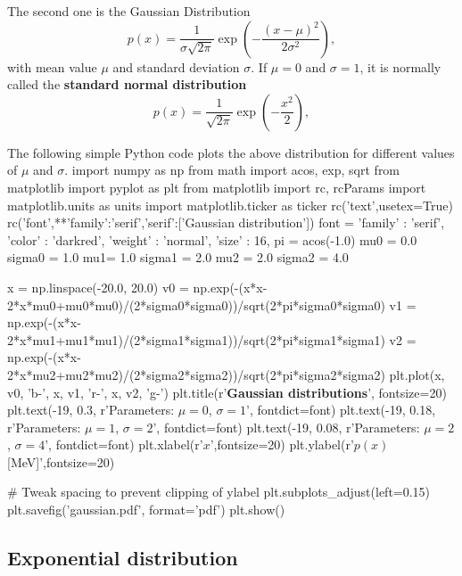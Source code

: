 \documentclass[%
oneside,                 %
final,                   %
10pt]{article}
\newenvironment{block_mdfboxadmon}[1][]{
\begin{block_mdfboxmdframed}[frametitle=#1]
}
{
\end{block_mdfboxmdframed}
}
\begin{document}
\begin{block_mdfboxadmon}[]
The second one is the Gaussian Distribution
\begin{equation*}
p(x) = \frac{1}{\sigma\sqrt{2\pi}} \exp{(-\frac{(x-\mu)^2}{2\sigma^2})},
\end{equation*}
with mean value $\mu$ and standard deviation $\sigma$. If $\mu=0$ and $\sigma=1$, it is normally called the \textbf{standard normal distribution}
\begin{equation*}
p(x) = \frac{1}{\sqrt{2\pi}} \exp{(-\frac{x^2}{2})},
\end{equation*}

The following simple Python code plots the above distribution for different values of $\mu$ and $\sigma$. 
\bpypro
import numpy as np
from math import acos, exp, sqrt
from  matplotlib import pyplot as plt
from matplotlib import rc, rcParams
import matplotlib.units as units
import matplotlib.ticker as ticker
rc('text',usetex=True)
rc('font',**{'family':'serif','serif':['Gaussian distribution']})
font = {'family' : 'serif',
        'color'  : 'darkred',
        'weight' : 'normal',
        'size'   : 16,
        }
pi = acos(-1.0)
mu0 = 0.0
sigma0 = 1.0
mu1= 1.0
sigma1 = 2.0
mu2 = 2.0
sigma2 = 4.0

x = np.linspace(-20.0, 20.0)
v0 = np.exp(-(x*x-2*x*mu0+mu0*mu0)/(2*sigma0*sigma0))/sqrt(2*pi*sigma0*sigma0)
v1 = np.exp(-(x*x-2*x*mu1+mu1*mu1)/(2*sigma1*sigma1))/sqrt(2*pi*sigma1*sigma1)
v2 = np.exp(-(x*x-2*x*mu2+mu2*mu2)/(2*sigma2*sigma2))/sqrt(2*pi*sigma2*sigma2)
plt.plot(x, v0, 'b-', x, v1, 'r-', x, v2, 'g-')
plt.title(r'{\bf Gaussian distributions}', fontsize=20)
plt.text(-19, 0.3, r'Parameters: $\mu = 0$, $\sigma = 1$', fontdict=font)
plt.text(-19, 0.18, r'Parameters: $\mu = 1$, $\sigma = 2$', fontdict=font)
plt.text(-19, 0.08, r'Parameters: $\mu = 2$, $\sigma = 4$', fontdict=font)
plt.xlabel(r'$x$',fontsize=20)
plt.ylabel(r'$p(x)$ [MeV]',fontsize=20)

# Tweak spacing to prevent clipping of ylabel                                                                       
plt.subplots_adjust(left=0.15)
plt.savefig('gaussian.pdf', format='pdf')
plt.show()
\epypro
\end{block_mdfboxadmon} %




\subsection{Exponential distribution}
\end{document}
